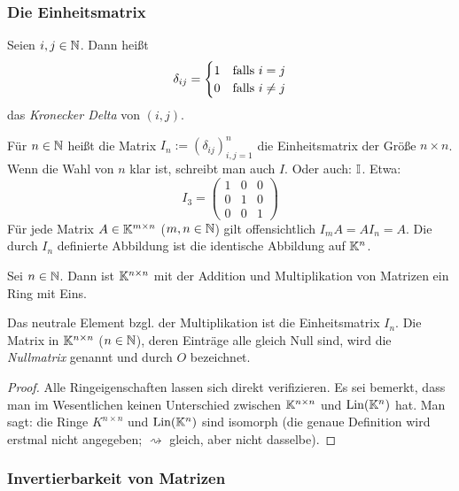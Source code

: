\subsubsection{Die Einheitsmatrix}

Seien $ i,j\in\mathbb N $. Dann heißt
\begin{equation}
	\delta_{ij} =
	\begin{cases}
		1 & \text{falls $ i = j $}\\
		0 & \text{falls $ i \neq j $}
	\end{cases}
\end{equation}
das \emph{Kronecker Delta} von $ (i,j) $.

Für $ n\in\mathbb N $ heißt die Matrix $ I_n := (\delta_{ij})_{i,j=1}^n $ die Einheitsmatrix der Größe $ n \times n $. Wenn die Wahl von $ n $ klar ist, schreibt man auch $ I $. Oder auch: $ \mathbb I $. Etwa:
\begin{equation}
	I_3 =
	\left( \begin{matrix}
	1 & 0 & 0 \\ 
	0 & 1 & 0 \\ 
	0 & 0 & 1
	\end{matrix}  \right)
\end{equation}
Für jede Matrix $ A\in\mathbb K^{m \times n} $ ($ m,n\in\mathbb N $) gilt offensichtlich $ I_mA = AI_n = A $. Die durch $ I_n $ definierte Abbildung ist die identische Abbildung auf $ \mathbb K^n $.

\begin{propn}
	Sei $ n\in\mathbb N $. Dann ist $ \mathbb K^{n \times n} $ mit der Addition und Multiplikation von Matrizen ein Ring mit Eins.
	
	Das neutrale Element bzgl. der Multiplikation ist die Einheitsmatrix $ I_n $. Die Matrix in $ \mathbb K^{n \times n} $ ($ n\in\mathbb N $), deren Einträge alle gleich Null sind, wird die \emph{Nullmatrix} genannt und durch $ O $ bezeichnet.
\end{propn}
\begin{proof}
	Alle Ringeigenschaften lassen sich direkt verifizieren. Es sei bemerkt, dass man im Wesentlichen keinen Unterschied zwischen $ \mathbb K^{n \times n} $ und $ \operatorname{Lin}(\mathbb K^n) $ hat. Man sagt: die Ringe $ K^{n \times n} $ und $ \operatorname{Lin}(\mathbb K^n) $ sind isomorph (die genaue Definition wird erstmal nicht angegeben; $ \rightsquigarrow $ gleich, aber nicht dasselbe).
\end{proof}

\subsubsection{Invertierbarkeit von Matrizen}

